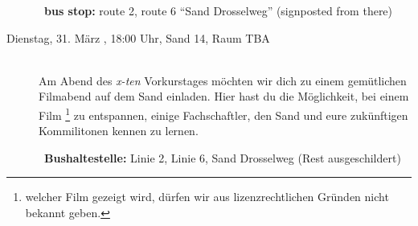 \begin{description}
	~\textbf{bus stop:} route 2, route 6 "`Sand Drosselweg"' (signposted from there)
\else
	\item[Dienstag, 31. März \YEAR, 18:00 Uhr, Sand 14, Raum TBA]\ \\
    Am Abend des \emph{x-ten} Vorkurstages möchten wir dich zu einem gemütlichen Filmabend auf dem Sand einladen.
	Hier hast du die Möglichkeit, bei einem Film \footnote{welcher Film gezeigt wird, dürfen wir aus lizenzrechtlichen Gründen nicht bekannt geben.} zu entspannen, einige Fachschaftler, den Sand und eure zukünftigen Kommilitonen kennen zu lernen.

	~\textbf{Bushaltestelle:} Linie 2, Linie 6, Sand Drosselweg (Rest ausgeschildert)
\fi




\end{description}
